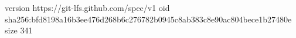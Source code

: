 version https://git-lfs.github.com/spec/v1
oid sha256:bfd8198a16b3ee476d268b6c276782b0945c8ab383c8e90ac804bece1b27480e
size 341
